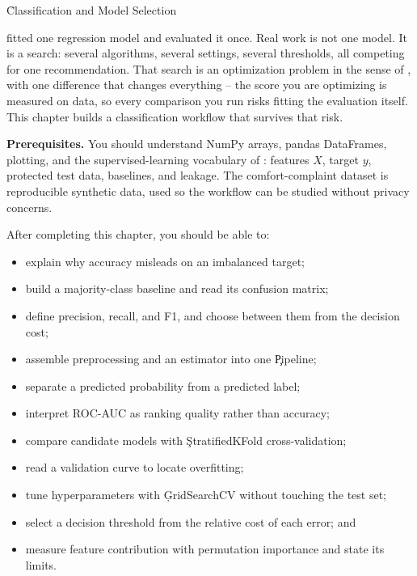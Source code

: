 
\h{Classification and Model Selection}
\label{ch:21}

 fitted one regression model and evaluated it once.
Real work is not one model. It is a search: several algorithms, several settings,
several thresholds, all competing for one recommendation. That search is an
optimization problem in the sense of , with one
difference that changes everything -- the score you are optimizing is measured on
data, so every comparison you run risks fitting the evaluation itself. This
chapter builds a classification workflow that survives that risk.

\begin{NoteBox}
\textbf{Prerequisites.} You should understand NumPy arrays, pandas DataFrames,
plotting, and the supervised-learning vocabulary of :
features $X$, target $y$, protected test data, baselines, and leakage. The
comfort-complaint dataset is reproducible synthetic data, used so the workflow
can be studied without privacy concerns.
\end{NoteBox}

\begin{tcolorbox}[title=Learning outcomes,colframe=orange,colback=white,arc=2mm]
After completing this chapter, you should be able to:
\begin{itemize}
    \item explain why accuracy misleads on an imbalanced target;
    \item build a majority-class baseline and read its confusion matrix;
    \item define precision, recall, and F1, and choose between them from the decision cost;
    \item assemble preprocessing and an estimator into one \c{Pipeline};
    \item separate a predicted probability from a predicted label;
    \item interpret ROC-AUC as ranking quality rather than accuracy;
    \item compare candidate models with \c{StratifiedKFold} cross-validation;
    \item read a validation curve to locate overfitting;
    \item tune hyperparameters with \c{GridSearchCV} without touching the test set;
    \item select a decision threshold from the relative cost of each error; and
    \item measure feature contribution with permutation importance and state its limits.
\end{itemize}
\end{tcolorbox}

